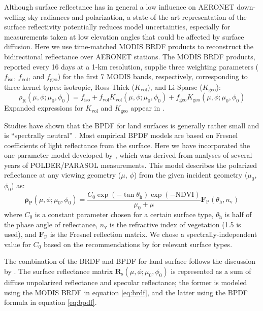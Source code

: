 Although surface reflectance has in general a low influence on AERONET
down-welling sky radiances and polarization, a state-of-the-art
representation of the surface reflectivity potentially reduces model
uncertainties, especially for measurements taken at low elevation angles
that could be affected by surface diffusion.
Here we use time-matched MODIS BRDF products 
to reconstruct the bidirectional reflectance over AERONET stations.
The MODIS BRDF products, reported every 16 days at a 1-km
resolution\citep{Lucht00}, 
supplie three weighting parameters
($f_\text{iso}$, $f_\text{vol}$, and $f_\text{geo}$) for the first 
7 MODIS bands, respectively, corresponding to three kernel types:
isotropic, Ross-Thick ($K_\text{vol}$), and Li-Sparse ($K_\text{geo}$):
\begin{equation}
\rho_\text{R}(\mu,\phi;\mu_0,\phi_0) = f_\text{iso} + 
f_\text{vol}K_\text{vol}(\mu,\phi;\mu_0,\phi_0) +
f_\text{geo}K_\text{geo}(\mu,\phi;\mu_0,\phi_0)  \label{eq:brdf}
\end{equation}
Expanded expressions for $K_\text{vol}$ and $K_\text{geo}$ appear in
\citet{Wanner95, Lucht00}. 

Studies have shown that the BPDF for land surfaces is generally rather
small and is “spectrally neutral” \citep{Nadal99, Maignan04, Maignan09,
Waquet07, Litvinov11}. 
Most empirical BPDF models are based on Fresnel coefficients of light
reflectance from the surface. Here we have incorporated the
one-parameter model developed by \citet{Maignan09}, which was
derived from analyses of several years of POLDER/PARASOL measurements.
This model describes the polarized reflectance at any viewing geometry
($\mu$, $\phi$) from the given incident geometry ($\mu_0$, $\phi_0$) as:
\begin{equation}
\pmb{\rho}_\text{P}(\mu,\phi;\mu_0,\phi_0) = 
\frac{C_0 \exp(-\tan \theta_\text{h})\exp(-\text{NDVI})}{\mu_0+\mu} 
\mathbf{F}_\text{P}(\theta_\text{h},n_\text{v}) \label{eq:bpdf}
\end{equation}
where $C_0$ is a constant parameter chosen for a certain surface type,
$\theta_\text{h}$ is half of the phase angle of reflectance, $n_\text{v}$ is 
the refractive index of vegetation (1.5 is used), and
$\mathbf{F}_\text{P}$ is the Fresnel reflection matrix. 
We chose a spectrally-independent value for $C_0$ based
on the recommendations by \citet{Maignan09} for relevant surface types. 

The combination of the BRDF and BPDF for land surface follows the
discussion by \citet{Dubovik11}. The surface reflectance matrix 
$\mathbf{R}_\text{s}(\mu,\phi;\mu_0,\phi_0)$
is represented as a sum of diffuse unpolarized
reflectance and specular reflectance; the former is modeled using the
MODIS BRDF in equation \eqref{eq:brdf}, and the latter using the BPDF 
formula in equation \eqref{eq:bpdf}. 

